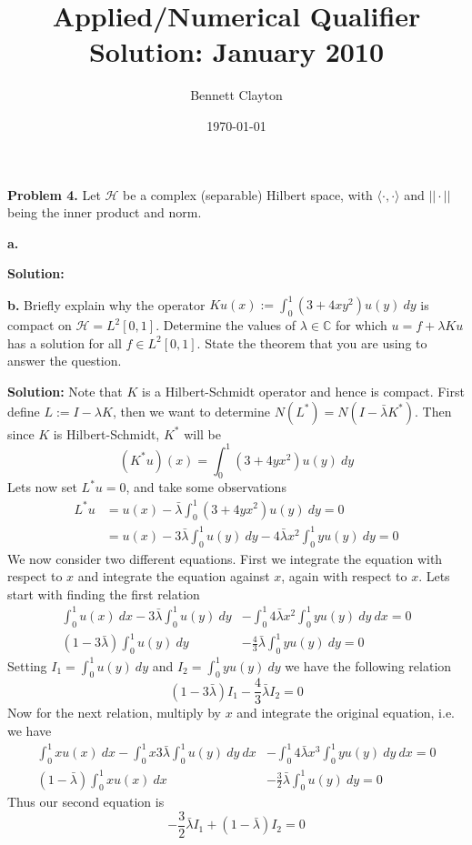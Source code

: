 \documentclass[11pt]{article}
\title{Applied/Numerical Qualifier Solution: January 2010}
\author{Bennett Clayton}
\affil{Texas A\&M University}
\date{\today}
\begin{document}
\maketitle




\textbf{Problem 4.}
Let $\mathcal{H}$ be a complex (separable) Hilbert space, with $\langle \cdot, \cdot \rangle$ and $||\cdot ||$ being the inner product and norm.

\vskip 1cm


\textbf{a.}

\vskip 1cm


\textbf{Solution:}


\vskip 2cm



\textbf{b.} Briefly explain why the operator $Ku(x) := \int_0^1 (3 + 4xy^2) u(y) \: dy$ is compact on $\mathcal{H} = L^2[0,1]$. 
Determine the values of $\lambda \in \mathbb{C}$ for which $u = f + \lambda Ku$ has a solution for all $f \in L^2[0,1]$. 
State the theorem that you are using to answer the question. 

\vskip 1cm

\textbf{Solution:} Note that $K$ is a Hilbert-Schmidt operator and hence is compact.
First define $L := I - \lambda K$, then we want to determine $N(L^*) = N(I - \bar{\lambda}K^*)$. 
Then since $K$ is Hilbert-Schmidt, $K^*$ will be 
\[ (K^*u)(x) = \int_0^1 (3 + 4yx^2)u(y) \: dy \]
Lets now set $L^*u = 0$, and take some observations
\begin{align*}
L^*u &= u(x) - \bar{\lambda}\int_0^1 (3 + 4yx^2)u(y) \: dy = 0 \\
&= u(x) - 3\bar{\lambda}\int_0^1 u(y) \: dy - 4\bar{\lambda}x^2 \int_0^1 y u(y) \: dy = 0
\end{align*}
We now consider two different equations. 
First we integrate the equation with respect to $x$ and integrate the equation against $x$, again with respect to $x$. 
Lets start with finding the first relation
\begin{align*}
\int_0^1 u(x) \: dx  - 3\bar{\lambda}\int_0^1 u(y) \: dy &- \int_0^1 4\bar{\lambda}x^2 \int_0^1 y u(y) \: dy \: dx = 0 \\
(1 - 3\bar{\lambda})\int_0^1 u(y) \: dy &- \frac{4}{3} \bar{\lambda} \int_0^1 y u(y) \: dy = 0
\end{align*}
Setting $I_1 = \int_0^1 u(y) \: dy$ and $I_2 = \int_0^1 y u(y) \: dy$ we have the following relation
\[ (1 - 3\bar{\lambda}) I_1 - \frac{4}{3}\bar{\lambda} I_2 = 0  \]
Now for the next relation, multiply by $x$ and integrate the original equation, i.e. we have 
\begin{align*}
\int_0^1 x u(x) \: dx  - \int_0^1 x 3\bar{\lambda}\int_0^1 u(y) \: dy \: dx &- \int_0^1 4\bar{\lambda}x^3 \int_0^1 y u(y) \: dy \: dx = 0 \\
(1 - \bar{\lambda}) \int_0^1 xu(x) \: dx &- \frac{3}{2}\bar{\lambda}\int_0^1 u(y) \: dy = 0
\end{align*}
Thus our second equation is 
\[ -\frac{3}{2}\bar{\lambda} I_1 + (1 - \bar{\lambda}) I_2 = 0 \]
\end{document}
